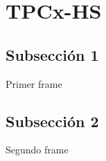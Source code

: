 
\section{TPCx-HS}

	\subsection*{Subsección 1}

		\begin{frame}{Primer frame}

		\end{frame}
	
	\subsection*{Subsección 2}	

		\begin{frame}{Segundo frame}
				
		\end{frame}
				